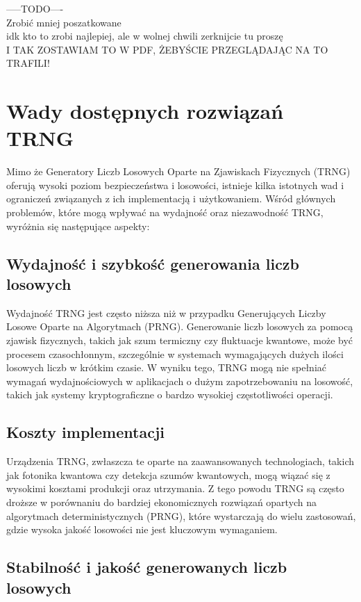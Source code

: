         -----TODO---- \\
    Zrobić mniej poszatkowane \\
    idk kto to zrobi najlepiej, ale w wolnej chwili zerknijcie tu proszę \\
    I TAK ZOSTAWIAM TO W PDF, ŻEBYŚCIE PRZEGLĄDAJĄC NA TO TRAFILI! \\


\section{Wady dostępnych rozwiązań TRNG}

Mimo że Generatory Liczb Losowych Oparte na Zjawiskach Fizycznych (TRNG) oferują wysoki poziom bezpieczeństwa i losowości,
istnieje kilka istotnych wad i ograniczeń związanych z ich implementacją i użytkowaniem.
Wśród głównych problemów, które mogą wpływać na wydajność oraz niezawodność TRNG, wyróżnia się następujące aspekty:

\subsection{Wydajność i szybkość generowania liczb losowych}

Wydajność TRNG jest często niższa niż w przypadku Generujących Liczby Losowe Oparte na Algorytmach (PRNG).
Generowanie liczb losowych za pomocą zjawisk fizycznych, takich jak szum termiczny czy fluktuacje kwantowe,
może być procesem czasochłonnym, szczególnie w systemach wymagających dużych ilości losowych liczb w krótkim czasie.
W wyniku tego, TRNG mogą nie spełniać wymagań wydajnościowych w aplikacjach o dużym zapotrzebowaniu na losowość,
takich jak systemy kryptograficzne o bardzo wysokiej częstotliwości operacji.

\subsection{Koszty implementacji}

Urządzenia TRNG, zwłaszcza te oparte na zaawansowanych technologiach,
takich jak fotonika kwantowa czy detekcja szumów kwantowych,
mogą wiązać się z wysokimi kosztami produkcji oraz utrzymania.
Z tego powodu TRNG są często droższe w porównaniu do bardziej ekonomicznych rozwiązań opartych na algorytmach deterministycznych (PRNG),
które wystarczają do wielu zastosowań, gdzie wysoka jakość losowości nie jest kluczowym wymaganiem.

\subsection{Stabilność i jakość generowanych liczb losowych}

